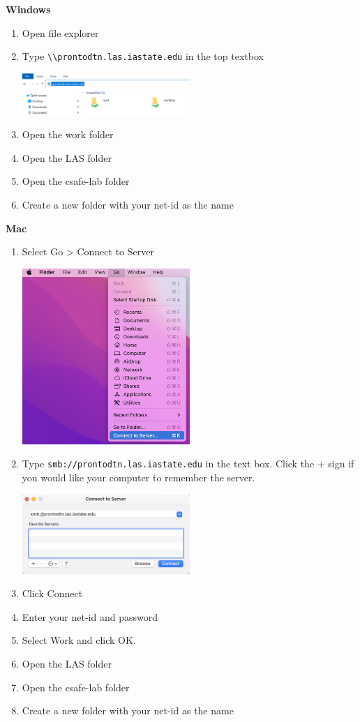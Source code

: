\documentclass[
]{book}
\providecommand{\tightlist}{%
  \setlength{\itemsep}{0pt}\setlength{\parskip}{0pt}}
\begin{document}
\textbf{Windows}

\begin{enumerate}
\def\labelenumi{\arabic{enumi}.}
\tightlist
\item
  Open file explorer
\item
  Type \texttt{\textbackslash{}\textbackslash{}prontodtn.las.iastate.edu} in the top textbox

  \includegraphics[width=0.5\textwidth,height=0.5\textheight]{images/explorer.png}
\item
  Open the work folder
\item
  Open the LAS folder
\item
  Open the csafe-lab folder
\item
  Create a new folder with your net-id as the name
\end{enumerate}

\textbf{Mac}

\begin{enumerate}
\def\labelenumi{\arabic{enumi}.}
\tightlist
\item
  Select Go \textgreater{} Connect to Server

  \includegraphics[width=0.5\textwidth,height=0.5\textheight]{images/connect_to_server.png}
\item
  Type \texttt{smb://prontodtn.las.iastate.edu} in the text box. Click the + sign if you would like your computer to remember the server.

  \includegraphics[width=0.5\textwidth,height=0.5\textheight]{images/add_server.png}
\item
  Click Connect
\item
  Enter your net-id and password
\item
  Select Work and click OK.
\item
  Open the LAS folder
\item
  Open the csafe-lab folder
\item
  Create a new folder with your net-id as the name
\end{enumerate}
\end{document}
